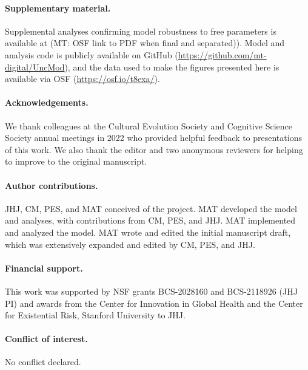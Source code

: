 \documentclass[letterpaper,11.5pt]{scrartcl}
\newcommand{\mt}[1]{{\textcolor{myorange} {({\tiny MT:} #1)}}}
\newcommand{\cm}[1]{{\textcolor{mypurple} {({\tiny CM:} #1)}}}
\begin{document}
\paragraph{Supplementary material.} Supplemental analyses confirming model robustness to free parameters is available at \mt{OSF link to PDF when final and separated)}. Model and analysis code is publicly available on GitHub (\url{https://github.com/mt-digital/UncMod}), and the data used to make the figures presented here is available via OSF (\url{https://osf.io/t8exa/}).

\paragraph{Acknowledgements.} We thank colleagues at the Cultural Evolution
Society and Cognitive Science Society annual meetings in 2022 who provided helpful feedback
to presentations of this work. We also thank the editor and two anonymous reviewers
for helping to improve to the original manuscript.%
% 

\paragraph{Author contributions.} JHJ, CM, PES, and MAT conceived of the project. MAT developed the model
and analyses, with contributions from CM, PES, and JHJ. MAT implemented and analyzed the model. MAT wrote and edited the initial manuscript draft, which was extensively expanded and edited by CM, PES, and JHJ.

\paragraph{Financial support.} This work was supported by NSF grants BCS-2028160 and BCS-2118926 (JHJ PI) and awards from the Center for Innovation in Global Health and the Center for Existential Risk, Stanford University to JHJ.

\paragraph{Conflict of interest.} No conflict declared. \\[1em]


\end{document}

